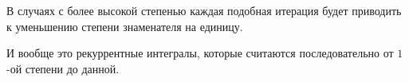 \begin{itemize}
\begin{example}
  \begin{remark}
    В случаях с более высокой степенью каждая подобная итерация будет приводить
    к уменьшению степени знаменателя на единицу.
  \end{remark}
  
  \todo И вообще это рекуррентные интегралы, которые считаются последовательно от
  \(1\)-ой степени до данной.
\end{example}

\end{itemize}
